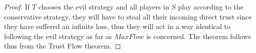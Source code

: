 \begin{proof}
   If $T$ chooses the evil strategy and all players in $S$ play according to the conservative strategy, they will have
   to steal all their incoming direct trust since they have suffered an infinite loss, thus they will act in a way
   identical to following the evil strategy as far as $MaxFlow$ is concerned. The theorem follows thus from the Trust
   Flow theorem.
\end{proof}
